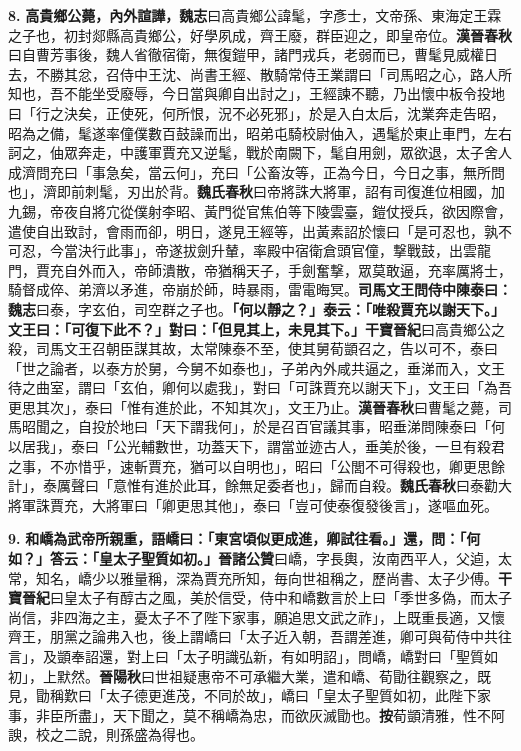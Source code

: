 \textbf{8.} \textbf{高貴鄉公薨，內外諠譁，}{\footnotesize \textbf{魏志}曰高貴鄉公諱髦，字彥士，文帝孫、東海定王霖之子也，初封郯縣高貴鄉公，好學夙成，齊王廢，群臣迎之，即皇帝位。\textbf{漢晉春秋}曰自曹芳事後，魏人省徹宿衛，無復鎧甲，諸門戎兵，老弱而已，曹髦見威權日去，不勝其忿，召侍中王沈、尚書王經、散騎常侍王業謂曰「司馬昭之心，路人所知也，吾不能坐受廢辱，今日當與卿自出討之」，王經諫不聽，乃出懷中板令投地曰「行之決矣，正使死，何所恨，況不必死邪」，於是入白太后，沈業奔走告昭，昭為之備，髦遂率僮僕數百鼓譟而出，昭弟屯騎校尉伷入，遇髦於東止車門，左右訶之，伷眾奔走，中護軍賈充又逆髦，戰於南闕下，髦自用劍，眾欲退，太子舍人成濟問充曰「事急矣，當云何」，充曰「公畜汝等，正為今日，今日之事，無所問也」，濟即前刺髦，刃出於背。\textbf{魏氏春秋}曰帝將誅大將軍，詔有司復進位相國，加九錫，帝夜自將宂從僕射李昭、黃門從官焦伯等下陵雲臺，鎧仗授兵，欲因際會，遣使自出致討，會雨而卻，明日，遂見王經等，出黃素詔於懷曰「是可忍也，孰不可忍，今當決行此事」，帝遂拔劍升輦，率殿中宿衛倉頭官僮，撃戰鼓，出雲龍門，賈充自外而入，帝師潰散，帝猶稱天子，手劍奮撃，眾莫敢逼，充率厲將士，騎督成倅、弟濟以矛進，帝崩於師，時暴雨，雷電晦冥。}\textbf{司馬文王問侍中陳泰曰：}{\footnotesize \textbf{魏志}曰泰，字玄伯，司空群之子也。}\textbf{「何以靜之？」泰云：「唯殺賈充以謝天下。」文王曰：「可復下此不？」對曰：「但見其上，未見其下。」}{\footnotesize \textbf{干寶晉紀}曰高貴鄉公之殺，司馬文王召朝臣謀其故，太常陳泰不至，使其舅荀顗召之，告以可不，泰曰「世之論者，以泰方於舅，今舅不如泰也」，子弟內外咸共逼之，垂涕而入，文王待之曲室，謂曰「玄伯，卿何以處我」，對曰「可誅賈充以謝天下」，文王曰「為吾更思其次」，泰曰「惟有進於此，不知其次」，文王乃止。\textbf{漢晉春秋}曰曹髦之薨，司馬昭聞之，自投於地曰「天下謂我何」，於是召百官議其事，昭垂涕問陳泰曰「何以居我」，泰曰「公光輔數世，功蓋天下，謂當並迹古人，垂美於後，一旦有殺君之事，不亦惜乎，速斬賈充，猶可以自明也」，昭曰「公閭不可得殺也，卿更思餘計」，泰厲聲曰「意惟有進於此耳，餘無足委者也」，歸而自殺。\textbf{魏氏春秋}曰泰勸大將軍誅賈充，大將軍曰「卿更思其他」，泰曰「豈可使泰復發後言」，遂嘔血死。}

\textbf{9.} \textbf{和嶠為武帝所親重，語嶠曰：「東宮頃似更成進，卿試往看。」還，問：「何如？」答云：「皇太子聖質如初。」}{\footnotesize \textbf{晉諸公贊}曰嶠，字長輿，汝南西平人，父逌，太常，知名，嶠少以雅量稱，深為賈充所知，毎向世祖稱之，歷尚書、太子少傅。\textbf{干寶晉紀}曰皇太子有醇古之風，美於信受，侍中和嶠數言於上曰「季世多偽，而太子尚信，非四海之主，憂太子不了陛下家事，願追思文武之祚」，上既重長適，又懷齊王，朋黨之論弗入也，後上謂嶠曰「太子近入朝，吾謂差進，卿可與荀侍中共往言」，及顗奉詔還，對上曰「太子明識弘新，有如明詔」，問嶠，嶠對曰「聖質如初」，上默然。\textbf{晉陽秋}曰世祖疑惠帝不可承繼大業，遣和嶠、荀勖往觀察之，既見，勖稱歎曰「太子德更進茂，不同於故」，嶠曰「皇太子聖質如初，此陛下家事，非臣所盡」，天下聞之，莫不稱嶠為忠，而欲灰滅勖也。\textbf{按}荀顗清雅，性不阿諛，校之二說，則孫盛為得也。}

